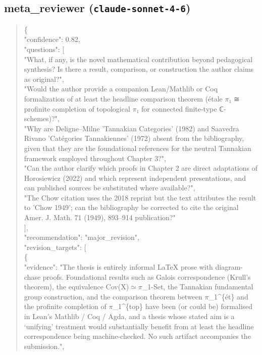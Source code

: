 \documentclass[11pt]{article}
\begin{document}
\subsection*{meta\_reviewer (\texttt{claude-sonnet-4-6})}
\begin{quote}\small\ttfamily\raggedright
\{\\
  "confidence": 0.82,\\
  "questions": [\\
    "What, if any, is the novel mathematical contribution beyond pedagogical synthesis? Is there a result, comparison, or construction the author claims as original?",\\
    "Would the author provide a companion Lean/Mathlib or Coq formalization of at least the headline comparison theorem (étale \ensuremath{\pi}₁ ≅ profinite completion of topological \ensuremath{\pi}₁ for connected finite-type ℂ-schemes)?",\\
    "Why are Deligne--Milne 'Tannakian Categories' (1982) and Saavedra Rivano 'Catégories Tannakiennes' (1972) absent from the bibliography, given that they are the foundational references for the neutral Tannakian framework employed throughout Chapter 3?",\\
    "Can the author clarify which proofs in Chapter 2 are direct adaptations of Horosiewicz (2022) and which represent independent presentations, and can published sources be substituted where available?",\\
    "The Chow citation uses the 2018 reprint but the text attributes the result to 'Chow 1949'; can the bibliography be corrected to cite the original Amer. J. Math. 71 (1949), 893--914 publication?"\\
  ],\\
  "recommendation": "major\_revision",\\
  "revision\_targets": [\\
    \{\\
      "evidence": "The thesis is entirely informal LaTeX prose with diagram-chase proofs. Foundational results such as Galois correspondence (Krull’s theorem), the equivalence Cov(X)\ensuremath{\simeq}\ensuremath{\pi}\_1-Set, the Tannakian fundamental group construction, and the comparison theorem between \ensuremath{\pi}\_1\^{}\{ét\} and the profinite completion of \ensuremath{\pi}\_1\^{}\{top\} have been (or could be) formalised in Lean’s Mathlib / Coq / Agda, and a thesis whose stated aim is a ‘unifying’ treatment would substantially benefit from at least the headline correspondence being machine-checked. No such artifact accompanies the submission.",\\

\end{quote}
\end{document}
